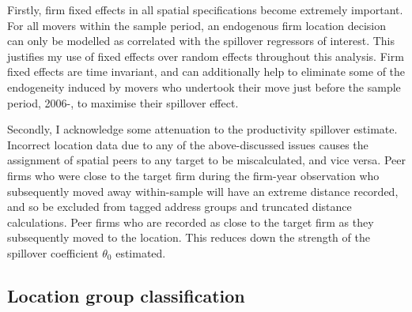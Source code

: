 Firstly, firm fixed effects in all spatial specifications become extremely important.
For all movers within the sample period, an endogenous firm location decision
can only be modelled as correlated with the spillover regressors of interest.
This justifies my use of fixed effects over random effects throughout this analysis.
Firm fixed effects are time invariant, and can additionally help to eliminate
some of the endogeneity induced by movers who undertook their move
just before the sample period, 2006-, to maximise their spillover effect.
\par
Secondly, I acknowledge some attenuation to the productivity spillover estimate.
Incorrect location data due to any of the above-discussed issues
causes the assignment of spatial peers to any target to be miscalculated,
and vice versa.
Peer firms who were close to the target firm during the firm-year observation
who subsequently moved away within-sample will have an extreme distance recorded,
and so be excluded from tagged address groups and truncated distance calculations.
Peer firms who are recorded as close to the target firm as they subsequently moved to the location.
This reduces down the strength of the spillover coefficient $\theta_0$ estimated.

\subsection{Location group classification}

